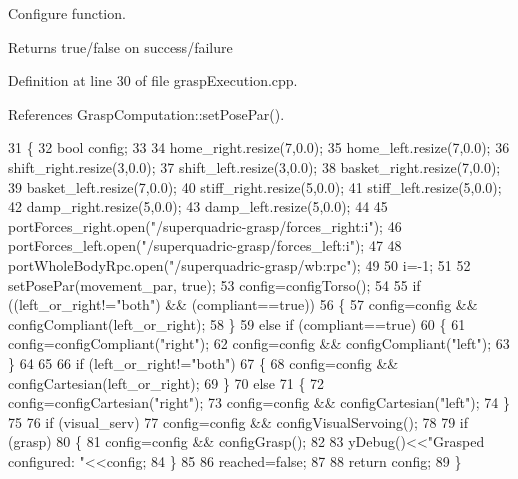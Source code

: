 Configure function. 

\begin{DoxyReturn}{Returns}
true/false on success/failure 
\end{DoxyReturn}


Definition at line 30 of file grasp\+Execution.\+cpp.



References Grasp\+Computation\+::set\+Pose\+Par().


\begin{DoxyCode}
31 \{
32     \textcolor{keywordtype}{bool} config;
33 
34     home_right.resize(7,0.0);
35     home_left.resize(7,0.0);
36     shift_right.resize(3,0.0);
37     shift_left.resize(3,0.0);
38     basket_right.resize(7,0.0);
39     basket_left.resize(7,0.0);
40     stiff_right.resize(5,0.0);
41     stiff_left.resize(5,0.0);
42     damp_right.resize(5,0.0);
43     damp_left.resize(5,0.0);
44 
45     portForces_right.open(\textcolor{stringliteral}{"/superquadric-grasp/forces\_right:i"});
46     portForces_left.open(\textcolor{stringliteral}{"/superquadric-grasp/forces\_left:i"});
47 
48     portWholeBodyRpc.open(\textcolor{stringliteral}{"/superquadric-grasp/wb:rpc"});
49 
50     i=-1;
51 
52     setPosePar(movement_par, \textcolor{keyword}{true});
53     config=configTorso();
54 
55     \textcolor{keywordflow}{if} ((left_or_right!=\textcolor{stringliteral}{"both"}) && (compliant==\textcolor{keyword}{true}))
56     \{
57         config=config && configCompliant(left_or_right);
58     \}
59     \textcolor{keywordflow}{else} \textcolor{keywordflow}{if} (compliant==\textcolor{keyword}{true})
60     \{
61         config=configCompliant(\textcolor{stringliteral}{"right"});
62         config=config && configCompliant(\textcolor{stringliteral}{"left"});
63     \}
64 
65 
66     \textcolor{keywordflow}{if} (left_or_right!=\textcolor{stringliteral}{"both"})
67     \{
68         config=config && configCartesian(left_or_right);
69     \}
70     \textcolor{keywordflow}{else}
71     \{
72         config=configCartesian(\textcolor{stringliteral}{"right"});
73         config=config && configCartesian(\textcolor{stringliteral}{"left"});
74     \}
75 
76     \textcolor{keywordflow}{if} (visual_serv)
77         config=config && configVisualServoing();
78 
79     \textcolor{keywordflow}{if} (grasp)
80     \{
81         config=config && configGrasp();
82 
83         yDebug()<<\textcolor{stringliteral}{"Grasped configured: "}<<config;
84     \}
85 
86     reached=\textcolor{keyword}{false};
87 
88     \textcolor{keywordflow}{return} config;
89 \}
\end{DoxyCode}
